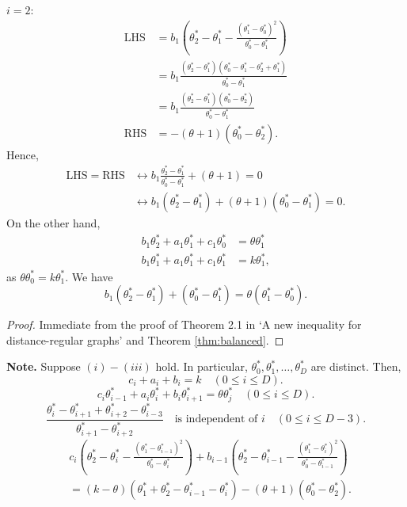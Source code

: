 \documentclass[
]{book}
\theoremstyle{definition}
\theoremstyle{definition}
\theoremstyle{definition}
\theoremstyle{definition}
\theoremstyle{remark}
\begin{document}
\(i=2\):
\begin{align}
\mathrm{LHS} & = b_1\left(\theta^*_2-\theta^*_1 - \frac{(\theta^*_1-\theta^*_0)^2}{\theta^*_0-\theta^*_1}\right)\\
& = b_1\frac{(\theta^*_2-\theta^*_1)(\theta^*_0-\theta^*_1-\theta^*_2+\theta^*_1)}{\theta^*_0-\theta^*_1}\\
& = b_1\frac{(\theta^*_2-\theta^*_1)(\theta^*_0-\theta^*_2)}{\theta^*_0-\theta^*_1}\\
\mathrm{RHS} & = -(\theta+1)(\theta^*_0-\theta^*_2).
\end{align}
Hence,
\begin{align}
\mathrm{LHS}=\mathrm{RHS} & \leftrightarrow b_1\frac{\theta^*_2-\theta^*_1}{\theta^*_0-\theta^*_1} + (\theta + 1) = 0\\
& \leftrightarrow b_1(\theta^*_2-\theta^*_1)+(\theta+1)(\theta^*_0-\theta^*_1) = 0.
\end{align}
On the other hand,
\begin{align}
b_1\theta^*_2 + a_1\theta^*_1 + c_1\theta^*_0 & = \theta \theta^*_1\\
b_1\theta^*_1 + a_1\theta^*_1 + c_1\theta^*_1 & = k \theta^*_1,
\end{align}
as \(\theta \theta^*_0 = k\theta^*_1\).
We have
\[b_1(\theta^*_2 - \theta^*_1) + (\theta^*_0-\theta^*_1) = \theta(\theta^*_1-\theta^*_0).\]

\begin{proof}
Immediate from the proof of Theorem 2.1 in `A new inequality for distance-regular graphs' \citep{terwilliger:1995} and Theorem \ref{thm:balanced}.
\end{proof}

\textbf{Note.} Suppose \((i)-(iii)\) hold. In particular, \(\theta^*_0, \theta^*_1, \ldots, \theta^*_D\) are distinct. Then,
\[c_i + a_i + b_i = k\quad (0\leq i\leq D).\]
\[c_i\theta^*_{i-1} + a_i\theta^*_i + b_i\theta^*_{i+1} = \theta \theta^*_j \quad (0\leq i\leq D).\]
\[\frac{\theta^*_i-\theta^*_{i+1}+\theta^*_{i+2}-\theta^*_{i-3}}{\theta^*_{i+1}-\theta^*_{i+2}}\quad \text{is independent of $i$}\quad (0\leq i\leq D-3).\]
\begin{align}
& c_i\left(\theta^*_2 - \theta^*_i - \frac{(\theta^*_1-\theta^*_{i-1})^2}{\theta^*_0-\theta^*_i}\right) + b_{i-1}\left(\theta^*_2 - \theta^*_{i-1} - \frac{(\theta^*_1-\theta^*_{i})^2}{\theta^*_0-\theta^*_{i-1}}\right)\\
& = (k-\theta)(\theta^*_1+\theta^*_2-\theta^*_{i-1}-\theta^*_i)-(\theta+1)(\theta^*_0-\theta^*_2).
\end{align}
\end{document}

